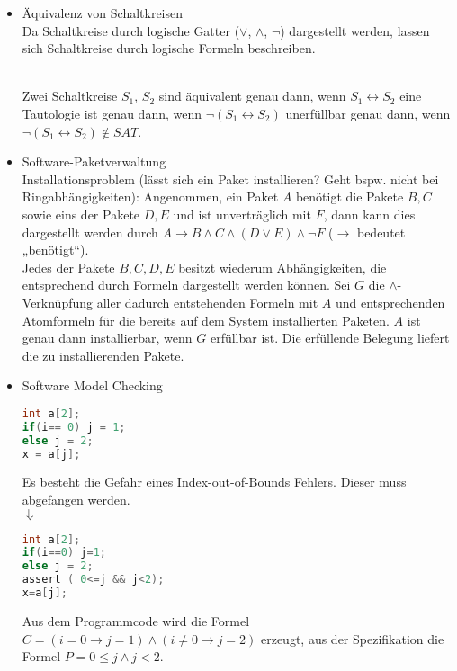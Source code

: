 \documentclass{scrreprt}
\begin{document}
\begin{itemize}
\item Äquivalenz von Schaltkreisen\\
Da Schaltkreise durch logische Gatter ($\vee$, $\wedge$, $\neg$) dargestellt werden, lassen sich Schaltkreise durch logische Formeln beschreiben.\\
\\
Zwei Schaltkreise $S_1$, $S_2$ sind äquivalent genau dann, wenn $S_1\leftrightarrow S_2$ eine Tautologie ist genau dann, wenn $\neg(S_1 \leftrightarrow S_2)$ unerfüllbar genau dann, wenn $\neg (S_1\leftrightarrow S_2) \not \in SAT$.
\item Software-Paketverwaltung\\
Installationsproblem (lässt sich ein Paket installieren? Geht bspw. nicht bei Ringabhängigkeiten): Angenommen, ein Paket $A$ benötigt die Pakete $B,C$ sowie eins der Pakete $D,E$ und ist unverträglich mit $F$, dann kann dies dargestellt werden durch $A \to B \wedge C \wedge (D \vee E) \wedge \neg F$ ($\to$ bedeutet „benötigt“).\\
Jedes der Pakete $B,C,D,E$ besitzt wiederum Abhängigkeiten, die entsprechend durch Formeln dargestellt werden können. Sei $G$ die $\wedge$-Verknüpfung aller dadurch entstehenden Formeln mit $A$ und entsprechenden Atomformeln für die bereits auf dem System installierten Paketen. $A$ ist genau dann installierbar, wenn $G$ erfüllbar ist. Die erfüllende Belegung liefert die zu installierenden Pakete.
\item Software Model Checking
\begin{lstlisting}[language=C]
int a[2];
if(i== 0) j = 1;
else j = 2;
x = a[j];
\end{lstlisting}
Es besteht die Gefahr eines Index-out-of-Bounds Fehlers. Dieser muss abgefangen werden.\\
$\Downarrow$
\begin{lstlisting}[language=C]
int a[2];
if(i==0) j=1;
else j = 2;
assert ( 0<=j && j<2);
x=a[j];
\end{lstlisting}
Aus dem Programmcode wird die Formel $C=(i=0 \to j=1)\wedge ( i \not = 0 \to j = 2)$ erzeugt, aus der Spezifikation die Formel $P=0\leq j \wedge j <2$.
\end{itemize}
\end{document}
